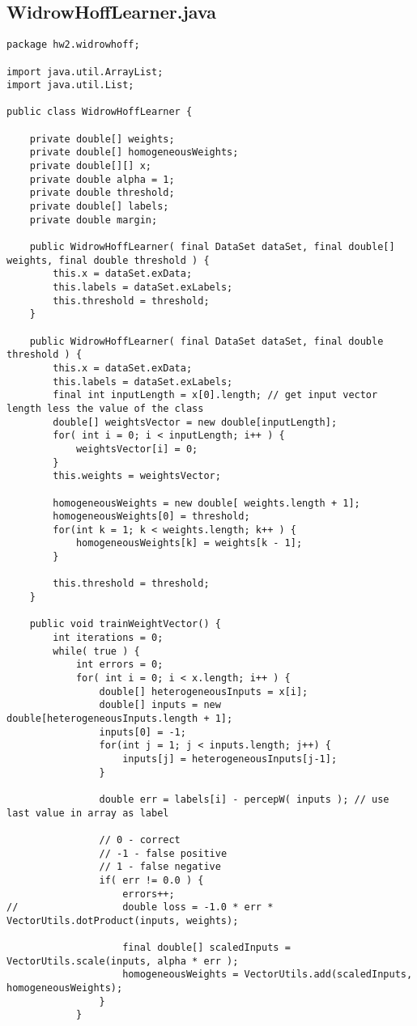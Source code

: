\subsection{WidrowHoffLearner.java}
\begin{lstlisting}
package hw2.widrowhoff;

import java.util.ArrayList;
import java.util.List;

public class WidrowHoffLearner {

	private double[] weights;
	private double[] homogeneousWeights;
	private double[][] x;
	private double alpha = 1;
	private double threshold;
	private double[] labels;
	private double margin;
	
	public WidrowHoffLearner( final DataSet dataSet, final double[] weights, final double threshold ) {
		this.x = dataSet.exData;
		this.labels = dataSet.exLabels;
		this.threshold = threshold;
	}
	
	public WidrowHoffLearner( final DataSet dataSet, final double threshold ) {
		this.x = dataSet.exData;
		this.labels = dataSet.exLabels;
		final int inputLength = x[0].length; // get input vector length less the value of the class
		double[] weightsVector = new double[inputLength];
		for( int i = 0; i < inputLength; i++ ) {
			weightsVector[i] = 0;
		}
		this.weights = weightsVector;
		
		homogeneousWeights = new double[ weights.length + 1];
		homogeneousWeights[0] = threshold;
		for(int k = 1; k < weights.length; k++ ) {
			homogeneousWeights[k] = weights[k - 1];
		}
		
		this.threshold = threshold;
	}
	
	public void trainWeightVector() {
		int iterations = 0;
		while( true ) {
			int errors = 0;
			for( int i = 0; i < x.length; i++ ) {
				double[] heterogeneousInputs = x[i];
				double[] inputs = new double[heterogeneousInputs.length + 1];
				inputs[0] = -1;
				for(int j = 1; j < inputs.length; j++) {
					inputs[j] = heterogeneousInputs[j-1];
				}
				
				double err = labels[i] - percepW( inputs ); // use last value in array as label
				
				// 0 - correct
				// -1 - false positive
				// 1 - false negative
				if( err != 0.0 ) {
					errors++;
//					double loss = -1.0 * err * VectorUtils.dotProduct(inputs, weights);
					
					final double[] scaledInputs = VectorUtils.scale(inputs, alpha * err );
					homogeneousWeights = VectorUtils.add(scaledInputs, homogeneousWeights);
				}
			}
			

\end{lstlisting}
